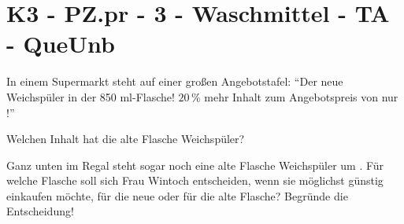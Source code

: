 \section{K3 - PZ.pr - 3 - Waschmittel - TA - QueUnb}

\begin{beispiel}{0} %
In einem Supermarkt steht auf einer großen Angebotstafel: "`Der neue Weichspüler in der 850 ml-Flasche! $20\,\%$ mehr Inhalt zum Angebotspreis von nur !"'

Welchen Inhalt hat die alte Flasche Weichspüler?

Ganz unten im Regal steht sogar noch eine alte Flasche Weichspüler um . Für welche Flasche soll sich Frau Wintoch entscheiden, wenn sie möglichst günstig einkaufen möchte, für die neue oder für die alte Flasche? Begründe die Entscheidung!

\end{beispiel}